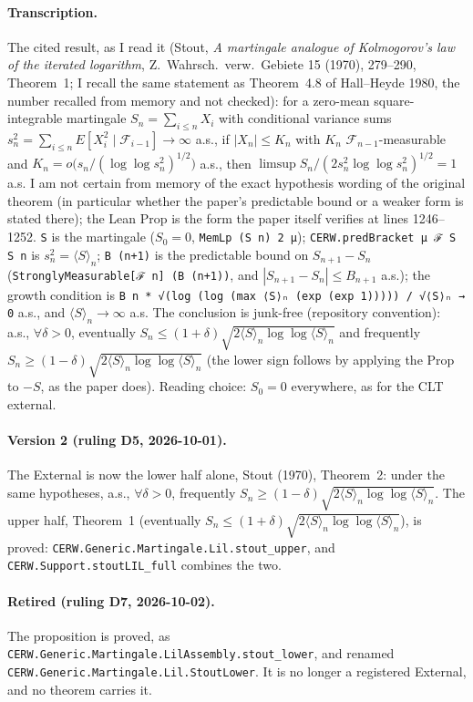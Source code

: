 \paragraph{Transcription.} The cited result, as I read it (Stout, \emph{A martingale analogue of Kolmogorov's law of the iterated logarithm}, Z.~Wahrsch.\ verw.\ Gebiete 15 (1970), 279--290,
Theorem~1; I recall the same statement as Theorem~4.8 of Hall--Heyde 1980, the number recalled from memory and not checked): for a zero-mean square-integrable martingale $S_n=\sum_{i\le n}X_i$ with conditional variance sums
$s_n^2=\sum_{i\le n}E[X_i^2\mid\mathcal F_{i-1}]\to\infty$ a.s., if $|X_n|\le K_n$ with $K_n$ $\mathcal F_{n-1}$-measurable and
$K_n=o\big(s_n/(\log\log s_n^2)^{1/2}\big)$ a.s., then $\limsup S_n/(2s_n^2\log\log s_n^2)^{1/2}=1$ a.s. I am not certain from memory of the exact hypothesis
wording of the original theorem (in particular whether the paper's predictable bound or a weaker form is stated there); the Lean Prop is the form the paper itself verifies at lines 1246--1252.
\texttt{S} is the martingale ($S_0=0$, \texttt{MemLp (S n) 2 μ}); \texttt{CERW.predBracket μ ℱ S S n} is $s_n^2=\langle S\rangle_n$; \texttt{B (n+1)} is the predictable bound on
$S_{n+1}-S_n$ (\texttt{StronglyMeasurable[ℱ n] (B (n+1))}, and $|S_{n+1}-S_n|\le B_{n+1}$ a.s.); the growth condition is
\texttt{B n * √(log (log (max ⟨S⟩ₙ (exp (exp 1))))) / √⟨S⟩ₙ → 0} a.s., and $\langle S\rangle_n\to\infty$ a.s. The conclusion is junk-free (repository convention): a.s.,
$\forall\delta>0$, eventually $S_n\le(1+\delta)\sqrt{2\langle S\rangle_n\log\log\langle S\rangle_n}$ and frequently $S_n\ge(1-\delta)\sqrt{2\langle S\rangle_n\log\log\langle S\rangle_n}$
(the lower sign follows by applying the Prop to $-S$, as the paper does). Reading choice: $S_0=0$ everywhere, as for the CLT external.
\paragraph{Version 2 (ruling D5, 2026-10-01).} The External is now the lower half alone, Stout (1970),
Theorem~2: under the same hypotheses, a.s., $\forall\delta>0$, frequently
$S_n\ge(1-\delta)\sqrt{2\langle S\rangle_n\log\log\langle S\rangle_n}$. The upper half, Theorem~1 (eventually
$S_n\le(1+\delta)\sqrt{2\langle S\rangle_n\log\log\langle S\rangle_n}$), is proved:
\texttt{CERW.Generic.Martingale.Lil.stout\_upper}, and \texttt{CERW.Support.stoutLIL\_full} combines the two.
\paragraph{Retired (ruling D7, 2026-10-02).} The proposition is proved, as \texttt{CERW.Generic.Martingale.LilAssembly.stout\_lower}, and renamed \texttt{CERW.Generic.Martingale.Lil.StoutLower}. It is no longer a registered External, and no theorem carries it.
